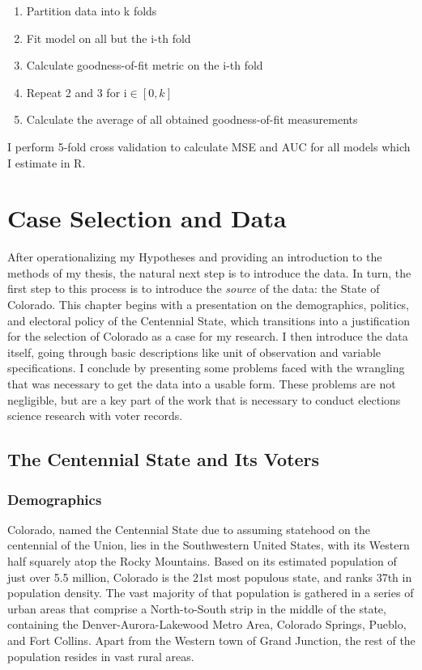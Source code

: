 \documentclass[12pt,twoside]{reedthesis}
\begin{document}
  \begin{enumerate}
  \item Partition data into k folds
  \item Fit model on all but the i-th fold
  \item Calculate goodness-of-fit metric on the i-th fold
  \item Repeat 2 and 3 for i$\in [0,k]$
  \item Calculate the average of all obtained goodness-of-fit measurements
  \end{enumerate}
  
  I perform 5-fold cross validation to calculate MSE and AUC for all
  models which I estimate in R.
  
  \chapter{Case Selection and Data}\label{case-selection-and-data}
  
  After operationalizing my Hypotheses and providing an introduction to
  the methods of my thesis, the natural next step is to introduce the
  data. In turn, the first step to this process is to introduce the
  \emph{source} of the data: the State of Colorado. This chapter begins
  with a presentation on the demographics, politics, and electoral policy
  of the Centennial State, which transitions into a justification for the
  selection of Colorado as a case for my research. I then introduce the
  data itself, going through basic descriptions like unit of observation
  and variable specifications. I conclude by presenting some problems
  faced with the wrangling that was necessary to get the data into a
  usable form. These problems are not negligible, but are a key part of
  the work that is necessary to conduct elections science research with
  voter records.
  
  \section{The Centennial State and Its
  Voters}\label{the-centennial-state-and-its-voters}
  
  \subsection{Demographics}\label{demographics}
  
  Colorado, named the Centennial State due to assuming statehood on the
  centennial of the Union, lies in the Southwestern United States, with
  its Western half squarely atop the Rocky Mountains. Based on its
  estimated population of just over 5.5 million, Colorado is the 21st most
  populous state, and ranks 37th in population density. The vast majority
  of that population is gathered in a series of urban areas that comprise
  a North-to-South strip in the middle of the state, containing the
  Denver-Aurora-Lakewood Metro Area, Colorado Springs, Pueblo, and Fort
  Collins. Apart from the Western town of Grand Junction, the rest of the
  population resides in vast rural areas.
  
\end{document}
